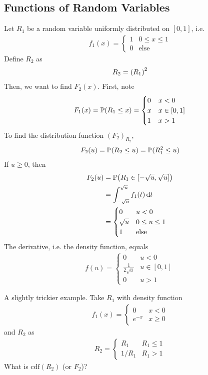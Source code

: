 \subsection{Functions of Random Variables}
Let $R_1$ be a random variable uniformly distributed on $[0,1]$, i.e.
\begin{align}
    f_1(x) = \begin{cases}
        1 & 0 \le x \le 1\\
        0 & \text{else}
    \end{cases}
\end{align}
Define $R_2$ as
\begin{align}
    R_2 = \qty(R_1)^2
\end{align}
Then, we want to find $F_2(x)$. First, note
\begin{align}
    F_1(x) = \mathbb{P}(R_1 \le x) = \begin{cases}
        0 & x < 0\\
        x & x \in [0,1]\\
        1 & x > 1
    \end{cases}
\end{align}
To find the distribution function $(F_2)_{R_2}$,
\begin{align}
    F_2(u) = \mathbb{P}(R_2 \le u) = \mathbb{P}(R_1^2 \le u)
\end{align}
If $u \ge 0$, then
\begin{align}
    F_2(u) &= \mathbb{P}\qty(R_1 \in [-\sqrt{u}, \sqrt{u}])\\
    &= \int_{-\sqrt{u}}^{\sqrt{u}} f_1(t) \dd{t}\\
    &= \begin{cases}
        0 & u < 0 \\
        \sqrt{u} & 0 \le u \le 1\\
        1 & \text{else}
    \end{cases}
\end{align}
The derivative, i.e. the density function, equals
\begin{align}
    f(u) = \begin{cases}
        0 & u < 0\\
        \frac{1}{2\sqrt{u}} & u \in [0,1] \\
        0 & u > 1
    \end{cases}
\end{align}
\begin{example}
    A slightly trickier example. Take $R_1$ with density function
    \begin{align}
        f_1(x) = \begin{cases}
            0 & x < 0\\
            e^{-x} & x \ge 0
        \end{cases}
    \end{align}
    and $R_2$ as
    \begin{align}
        R_2 = \begin{cases}
            R_1 & R_1 \le 1\\
            1/R_1 & R_1 > 1
        \end{cases}
    \end{align}
    What is $\text{cdf}(R_2)$ (or $F_2$)?
\end{example}
